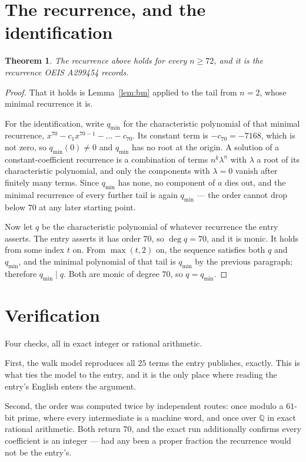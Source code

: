 \documentclass[11pt,a4paper]{article}
\theoremstyle{plain}
\newtheorem{theorem}{Theorem}
\theoremstyle{definition}
\begin{document}
\section{The recurrence, and the identification}

\begin{theorem}
The recurrence above holds for every $n\ge72$, and it is the recurrence OEIS A299454 records.
\end{theorem}

\begin{proof}
That it holds is Lemma~\ref{lem:bm} applied to the tail from $n=2$, whose minimal
recurrence it is.

For the identification, write $q_{\min}$ for the characteristic polynomial of that minimal
recurrence, $x^{70}-c_1x^{70-1}-\dots-c_{70}$. Its constant term is
$-c_{70}=-7168$, which is not zero, so $q_{\min}(0)\neq0$ and $q_{\min}$ has no
root at the origin. A solution of a constant-coefficient recurrence is a combination of terms
$n^{k}\lambda^{n}$ with $\lambda$ a root of its characteristic polynomial, and only the
components with $\lambda=0$ vanish after finitely many terms. Since $q_{\min}$ has none, no
component of $a$ dies out, and the minimal recurrence of every further tail is again
$q_{\min}$ --- the order cannot drop below $70$ at any later starting point.

Now let $q$ be the characteristic polynomial of whatever recurrence the entry asserts. The
entry asserts it has order $70$, so $\deg q=70$, and it is monic. It holds from some
index $t$ on. From $\max(t,2)$ on, the sequence satisfies both $q$ and $q_{\min}$, and
the minimal polynomial of that tail is $q_{\min}$ by the previous paragraph; therefore
$q_{\min}\mid q$. Both are monic of degree $70$, so $q=q_{\min}$.
\end{proof}

\section{Verification}

Four checks, all in exact integer or rational arithmetic.

First, the walk model reproduces all $25$ terms the entry publishes, exactly. This is
what ties the model to the entry, and it is the only place where reading the entry's English
enters the argument.

Second, the order was computed twice by independent routes: once modulo a $61$-bit prime, where
every intermediate is a machine word, and once over $\mathbb{Q}$ in exact rational arithmetic.
Both return $70$, and the exact run additionally confirms every coefficient is an integer
--- had any been a proper fraction the recurrence would not be the entry's.
\end{document}
